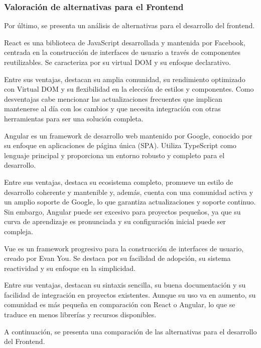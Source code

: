 \subsubsection{Valoración de alternativas para el Frontend}
Por último, se presenta un análisis de alternativas para el desarrollo del frontend.

React es una biblioteca de JavaScript desarrollada y mantenida por Facebook, centrada en la construcción de interfaces de usuario a través de componentes reutilizables. Se caracteriza por su virtual DOM y su enfoque declarativo.

Entre sus ventajas, destacan su amplia comunidad, su rendimiento optimizado con Virtual DOM y su flexibilidad en la elección de estilos y componentes. 
Como desventajas cabe mencionar las actualizaciones frecuentes que implican mantenerse al día con los cambios y que necesita integración con otras herramientas para ser una solución completa.


Angular es un framework de desarrollo web mantenido por Google, conocido por su enfoque en aplicaciones de página única (SPA). Utiliza TypeScript como lenguaje principal y proporciona un entorno robusto y completo para el desarrollo.

Entre sus ventajas, destaca su ecosistema completo, promueve un estilo de desarrollo coherente y mantenible y, además, cuenta con una comunidad activa y un amplio soporte de Google, lo que garantiza actualizaciones y soporte continuo.
Sin embargo, Angular puede ser excesivo para proyectos pequeños, ya que su curva de aprendizaje es pronunciada y su configuración inicial puede ser compleja.

Vue es un framework progresivo para la construcción de interfaces de usuario, creado por Evan You. Se destaca por su facilidad de adopción, su sistema reactividad y su enfoque en la simplicidad.

Entre sus ventajas, destacan su sintaxis sencilla, su buena documentación y su facilidad de integración en proyectos existentes.
Aunque su uso va en aumento, su comunidad es más pequeña en comparación con React o Angular, lo que se traduce en menos librerías y recursos disponibles.

A continuación, se presenta una comparación de las alternativas para el desarrollo del Frontend.

